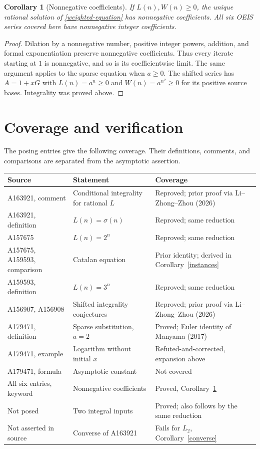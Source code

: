 \documentclass[11pt]{article}
\newtheorem{corollary}[theorem]{Corollary}
\begin{document}
\begin{corollary}[Nonnegative coefficients]\label{nonnegative}
If $L(n),W(n)\geq0$, the unique rational solution of
\eqref{weighted-equation} has nonnegative coefficients.
All six OEIS series covered here have nonnegative integer coefficients.
\end{corollary}
\begin{proof}
Dilation by a nonnegative number, positive integer powers, addition,
and formal exponentiation preserve nonnegative coefficients.
Thus every iterate starting at $1$ is nonnegative, and so is its
coefficientwise limit. The same argument applies to the sparse equation
when $a\geq0$. The shifted series has $A=1+xG$ with
$L(n)=a^n\geq0$ and $W(n)=a^{n^2}\geq0$ for its positive source bases.
Integrality was proved above.
\end{proof}

\section{Coverage and verification}

The posing entries give the following coverage. Their definitions, comments,
and comparisons are separated from the asymptotic assertion.
\begin{center}
\small
\begin{tabular}{@{}>{\raggedright\arraybackslash}p{}>{\raggedright\arraybackslash}p{}>{\raggedright\arraybackslash}p{}@{}}
\toprule
Source & Statement & Coverage\\
\midrule
A163921, comment & Conditional integrality for rational $L$ & Reproved; prior proof via Li--Zhong--Zhou (2026)\\
A163921, definition & $L(n)=\sigma(n)$ & Reproved; same reduction\\
A157675 & $L(n)=2^n$ & Reproved; same reduction\\
A157675, A159593, comparison & Catalan equation & Prior identity; derived in Corollary~\ref{instances}\\
A159593, definition & $L(n)=3^n$ & Reproved; same reduction\\
A156907, A156908 & Shifted integrality conjectures & Reproved; prior proof via Li--Zhong--Zhou (2026)\\
A179471, definition & Sparse substitution, $a=2$ & Proved; Euler identity of Manyama (2017)\\
A179471, example & Logarithm without initial $x$ & Refuted-and-corrected, expansion above\\
A179471, formula & Asymptotic constant & Not covered\\
All six entries, keyword & Nonnegative coefficients & Proved, Corollary~\ref{nonnegative}\\
Not posed & Two integral inputs & Proved; also follows by the same reduction\\
Not asserted in source & Converse of A163921 & Fails for $L_2$, Corollary~\ref{converse}\\
\bottomrule
\end{tabular}
\end{center}
\end{document}
